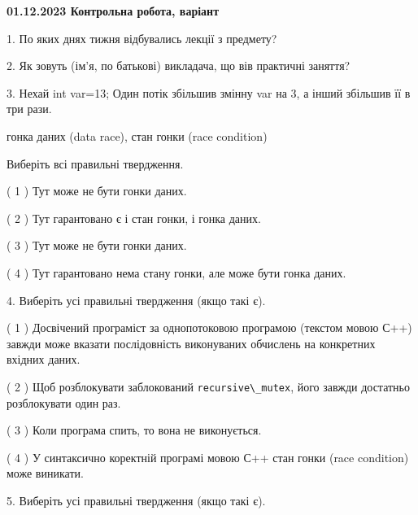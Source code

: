 \documentclass[12pt, ukrainian]{article}
\def\code#1{\Verb!#1!}
\begin{document}
\vspace{4mm}
\newpage
\begin {large}

\textbf{01.12.2023 Контрольна робота, варіант  }\par


{
1. По яких днях тижня відбувались лекції з предмету?



\vspace{5mm}
2. Як зовуть (ім'я, по батькові) викладача, що вів практичні заняття?



\vspace{5mm}
3. Нехай int var=13; Один потік збільшив змінну var на 3, а інший збільшив її в три рази.

гонка даних (data race), стан гонки (race condition)

Виберіть всі правильні твердження.\par
\vspace{2mm}
( 1 ) Тут може не бути гонки даних.%

( 2 ) Тут гарантовано є і стан гонки, і гонка даних.%

( 3 ) Тут може не бути гонки даних.%

( 4 ) Тут гарантовано нема стану гонки, але може бути гонка даних.%


\vspace{5mm}
4. Виберіть усі правильні твердження (якщо такі є).\par
\vspace{2mm}

( 1 ) Досвічений програміст за однопотоковою програмою (текстом мовою С++) завжди може вказати послідовність виконуваних обчислень на конкретних вхідних даних.%

( 2 ) Щоб розблокувати заблокований \code{recursive\_mutex}, його завжди достатньо розблокувати один раз.%

( 3 ) Коли програма спить, то вона не виконується.%

( 4 ) У синтаксично коректній програмі мовою С++ стан гонки (race condition) може виникати.%


\vspace{5mm}
5. Виберіть усі правильні твердження (якщо такі є).\par
\vspace{2mm}

}
\end{large}
\end{document}

